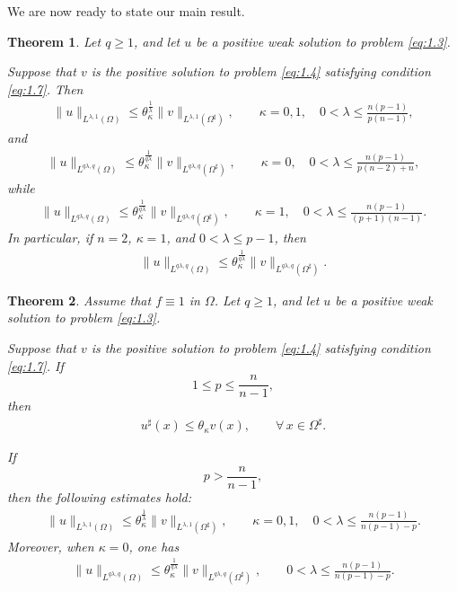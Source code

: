 \documentclass[11pt]{article}
\newtheorem{theorem}{Theorem}[section]
\numberwithin{equation}{section}
\theoremstyle{definition}
\theoremstyle{remark}
\begin{document}
We are now ready to state our main result.
\begin{theorem}\label{thm:1.2}
Let $q\ge 1$, and let $u$ be a positive weak solution to problem \eqref{eq:1.3}.


Suppose that $v$ is the positive solution to problem \eqref{eq:1.4}
satisfying condition \eqref{eq:1.7}. Then
\begin{align}\label{eq:1.8}
\|u\|_{L^{\lambda,1}(\Omega)}
\le
\theta_\kappa^{\frac{1}{\lambda}}
\|v\|_{L^{\lambda,1}(\Omega^\sharp)},
\qquad
\kappa=0,1,
\quad
0 < \lambda \le \frac{n(p-1)}{p(n-1)},
\end{align}
and
\begin{align}\label{eq:1.9}
\|u\|_{L^{q\lambda,q}(\Omega)}
\le
\theta_\kappa^{\frac{1}{q\lambda}}
\|v\|_{L^{q\lambda,q}(\Omega^\sharp)},
\qquad
\kappa=0,
\quad
0 < \lambda \le \frac{n(p-1)}{p(n-2)+n},
\end{align}
while
\begin{align}\label{eq:1.10}
\|u\|_{L^{q\lambda,q}(\Omega)}
\le
\theta_\kappa^{\frac{1}{q\lambda}}
\|v\|_{L^{q\lambda,q}(\Omega^\sharp)},
\qquad
\kappa=1,
\quad
0 < \lambda \le \frac{n(p-1)}{(p+1)(n-1)}.
\end{align}
In particular, if $n=2$, $\kappa=1$, and $0 < \lambda \le p-1$, then
\begin{align}\label{eq:1.11}
\|u\|_{L^{q\lambda,q}(\Omega)}
\le
\theta_\kappa^{\frac{1}{q\lambda}}
\|v\|_{L^{q\lambda,q}(\Omega^\sharp)}.
\end{align}
\end{theorem}
\begin{theorem}\label{thm:1.3}
Assume that $f\equiv1$ in $\Omega$.
Let $q\ge 1$, and let $u$ be a positive weak solution to problem \eqref{eq:1.3}.

Suppose that $v$ is the positive solution to problem \eqref{eq:1.4}
satisfying condition \eqref{eq:1.7}. If
\[
1\le p\le \frac{n}{n-1},
\]
then
\begin{align}
u^\sharp(x)\le \theta_\kappa v(x),
\qquad
\forall\,x\in\Omega^\sharp.
\end{align}

If
\[
p > \frac{n}{n-1},
\]
then the following estimates hold:
\begin{align}\label{eq:1.13}
\|u\|_{L^{\lambda,1}(\Omega)}
\le
\theta_\kappa^{\frac{1}{\lambda}}
\|v\|_{L^{\lambda,1}(\Omega^\sharp)},
\qquad
\kappa=0,1,
\quad
0<\lambda \le\frac{n(p-1)}{n(p-1)-p}.
\end{align}
Moreover, when $\kappa=0$, one has
\begin{align}\label{eq:1.14}
\|u\|_{L^{q\lambda,q}(\Omega)}
\le
\theta_\kappa^{\frac{1}{q\lambda}}
\|v\|_{L^{q\lambda,q}(\Omega^\sharp)},
\qquad
0<\lambda \le\frac{n(p-1)}{n(p-1)-p}.
\end{align}
\end{theorem}
\end{document}
